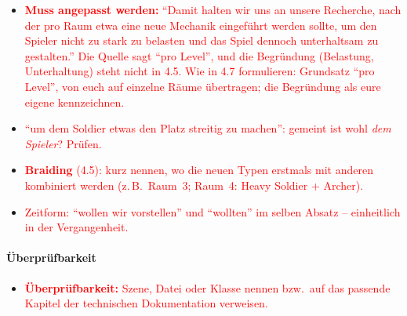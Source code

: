 \documentclass[../Main.tex]{subfiles}
\begin{document}
\begin{itemize}[leftmargin=1.5cm]
    \item \textcolor{red}{\textbf{Muss angepasst werden:} \enquote{Damit halten wir uns an unsere Recherche, nach der pro Raum etwa eine neue Mechanik eingeführt werden sollte, um den Spieler nicht zu stark zu belasten und das Spiel dennoch unterhaltsam zu gestalten.} Die Quelle sagt \enquote{pro Level}, und die Begründung (Belastung, Unterhaltung) steht nicht in 4.5. Wie in 4.7 formulieren: Grundsatz \enquote{pro Level}, von euch auf einzelne Räume übertragen; die Begründung als eure eigene kennzeichnen.}
    \item \textcolor{red}{\enquote{um dem Soldier etwas den Platz streitig zu machen}: gemeint ist wohl \emph{dem Spieler}? Prüfen.}
    \item \textcolor{red}{\textbf{Braiding} (4.5): kurz nennen, wo die neuen Typen erstmals mit anderen kombiniert werden (z.\,B.\ Raum~3; Raum~4: Heavy Soldier + Archer).}
    \item \textcolor{red}{Zeitform: \enquote{wollen wir vorstellen} und \enquote{wollten} im selben Absatz -- einheitlich in der Vergangenheit.}
\end{itemize}

\paragraph{Überprüfbarkeit}
\begin{itemize}[leftmargin=1.5cm]
    \item \textcolor{red}{\textbf{Überprüfbarkeit:} Szene, Datei oder Klasse nennen bzw.\ auf das passende Kapitel der technischen Dokumentation verweisen.}
\end{itemize}
\end{document}
